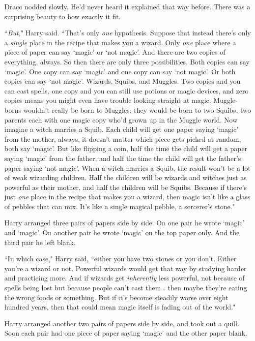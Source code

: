 Draco nodded slowly. He'd never heard it explained that way before. There was a surprising beauty to how exactly it fit.

``\emph{But,}" Harry said. ``That's only \emph{one} hypothesis. Suppose that instead there's only a \emph{single} place in the recipe that makes you a wizard. Only \emph{one} place where a piece of paper can say `magic' or `not magic'. And there are two copies of everything, always. So then there are only three possibilities. Both copies can say `magic'. One copy can say `magic' and one copy can say `not magic'. Or both copies can say `not magic'. Wizards, Squibs, and Muggles. Two copies and you can cast spells, one copy and you can still use potions or magic devices, and zero copies means you might even have trouble looking straight at magic. Muggle-borns wouldn't really be born to Muggles, they would be born to two Squibs, two parents each with one magic copy who'd grown up in the Muggle world. Now imagine a witch marries a Squib. Each child will get one paper saying `magic' from the mother, always, it doesn't matter which piece gets picked at random, both say `magic'. But like flipping a coin, half the time the child will get a paper saying `magic' from the father, and half the time the child will get the father's paper saying `not magic'. When a witch marries a Squib, the result won't be a lot of weak wizarding children. Half the children will be wizards and witches just as powerful as their mother, and half the children will be Squibs. Because if there's just \emph{one} place in the recipe that makes you a wizard, then magic isn't like a glass of pebbles that can mix. It's like a single magical pebble, a sorcerer's stone."

Harry arranged three pairs of papers side by side. On one pair he wrote `magic' and `magic'. On another pair he wrote `magic' on the top paper only. And the third pair he left blank.

``In which case," Harry said, ``either you have two stones or you don't. Either you're a wizard or not. Powerful wizards would get that way by studying harder and practicing more. And if wizards get \emph{inherently} less powerful, not because of spells being lost but because people can't cast them{\ldots} then maybe they're eating the wrong foods or something. But if it's become steadily worse over eight hundred years, then that could mean magic itself is fading out of the world."

Harry arranged another two pairs of papers side by side, and took out a quill. Soon each pair had one piece of paper saying `magic' and the other paper blank.

